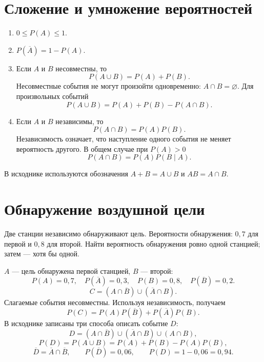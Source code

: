 \section*{Сложение и умножение вероятностей}
\begin{enumerate}
 \item $0\le P(A)\le1$.
 \item $P(\overline A)=1-P(A)$.
 \item Если $A$ и $B$ несовместны, то
 \[
 P(A\cup B)=P(A)+P(B).
 \]
 Несовместные события не могут произойти одновременно:
 $A\cap B=\varnothing$. Для произвольных событий
 \[
 P(A\cup B)=P(A)+P(B)-P(A\cap B).
 \]
 \item Если $A$ и $B$ независимы, то
 \[
 P(A\cap B)=P(A)P(B).
 \]
 Независимость означает, что наступление одного события не меняет
 вероятность другого. В общем случае при $P(A)>0$
 \[
 P(A\cap B)=P(A)P(B\mid A).
 \]
\end{enumerate}
В исходнике используются обозначения $A+B=A\cup B$ и $AB=A\cap B$.
\begin{center}
\end{center}

\section*{Обнаружение воздушной цели}
Две станции независимо обнаруживают цель. Вероятности обнаружения:
$0{,}7$ для первой и $0{,}8$ для второй. Найти вероятность обнаружения
ровно одной станцией; затем --- хотя бы одной.

$A$ --- цель обнаружена первой станцией, $B$ --- второй:
\[
 P(A)=0{,}7,\quad P(\overline A)=0{,}3,\quad
 P(B)=0{,}8,\quad P(\overline B)=0{,}2.
\]
\[
 C=(A\cap\overline B)\cup(\overline A\cap B).
\]
Слагаемые события несовместны. Используя независимость, получаем
\[
 P(C)=P(A)P(\overline B)+P(\overline A)P(B).
\]
В исходнике записаны три способа описать событие $D$:
\[
 D=(A\cap\overline B)\cup(\overline A\cap B)\cup(A\cap B),
\]
\[
 P(D)=P(A\cup B)=P(A)+P(B)-P(A)P(B),
\]
\[
 \overline D=\overline A\cap\overline B,\qquad
 P(\overline D)=0{,}06,\qquad P(D)=1-0{,}06=0{,}94.
\]

